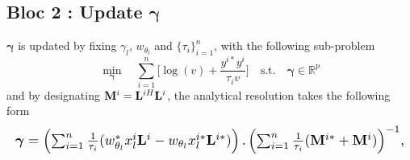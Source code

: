     \subsection*{\textbf{Bloc 2 : Update $\boldsymbol{\gamma}$}}
        \label{subsection:update_gamma}
        \noindent
        $\boldsymbol{\gamma}$ is updated by fixing $\gamma_{l}$, $w_{\theta_{l}}$ and $\{\tau_i\}_{i=1}^n$, with the following sub-problem 
        \vspace{-0.2cm}
        \begin{equation}
            \label{Equation:problem2}
            \min_{\boldsymbol{\gamma}} \quad \sum_{i=1}^n \Bigg[ \log\left( v \right) + \frac{y^{i*} y^i}{\tau_i v} \Bigg]  %
            \quad  \text{s.t.} \quad  \boldsymbol{\gamma}  \in \mathbb{R}^p
        \end{equation}
        and by designating %
        $\small \mathbf{M}^i = \small \mathbf{L}^{iH} \mathbf{L}^i$, the analytical resolution takes the following form
        \vspace{-0.1cm}
        \begin{equation}
            \label{Equation:gammaVector}
            \resizebox{\columnwidth}{!}{$
            \small \boldsymbol{\gamma} = \small \left(\sum_{i=1}^n \frac{1}{\tau_i} (w_{\theta_{l}}^* x_{l}^i \mathbf{L}^i - w_{\theta_{l}} x_{l}^{i*} \mathbf{L}^{i*})  \right) . \left(\sum_{i=1}^n \frac{1}{\tau_i} (\mathbf{M}^{i*} + \mathbf{M}^{i}) \right)^{-1}
            $,}
        \end{equation}
        \vspace{-1cm}
